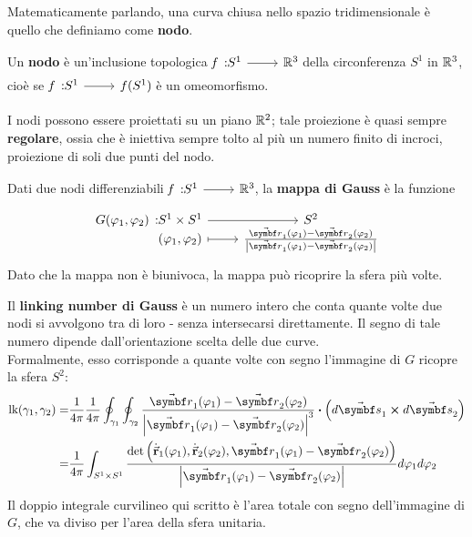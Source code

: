 Matematicamente parlando, una curva chiusa nello spazio tridimensionale è quello che definiamo come \textbf{nodo}.
\begin{define}[Nodo]
	Un \textbf{nodo} è un'inclusione topologica $\funz[f]{S^1}{\realset^3}$ della circonferenza $S^1$ in $\mathbb{R}^3$, cioè se $\funz[f]{S^1}{f(S^1)}$ è un omeomorfismo.
\end{define}
I nodi possono essere proiettati su un piano $\mathbb{R}^2$; tale proiezione è quasi sempre \textbf{regolare}, ossia che è iniettiva sempre tolto al più un numero finito di incroci, proiezione di soli due punti del nodo.
\begin{define}
	Dati due nodi differenziabili $\funz[f]{S^1}{\realset^3}$, la \textbf{mappa di Gauss} è la funzione
	\begin{equation}
		\funztot[G(\phi_1,\phi_2)]{S^1\times S^1}{S^2}{\left(\phi_1,\phi_2\right)}{\frac{\vba{r}_1(\phi_1) - \vba{r}_2 (\phi_2)}{\abs{\vba{r}_1(\phi_1) - \vba{r}_2(\phi_2)}}}
	\end{equation}
	Dato che la mappa non è biunivoca, la mappa può ricoprire la sfera più volte.
\end{define}
\begin{define}
	Il \textbf{linking number di Gauss} è un numero intero che conta quante volte due nodi si avvolgono tra di loro - senza intersecarsi direttamente. Il segno di tale numero dipende dall'orientazione scelta delle due curve.\\
	Formalmente, esso corrisponde a quante volte con segno l'immagine di $G$ ricopre la sfera $S^2$:
	\begin{align}
		\textrm{lk}(\gamma_1,\gamma_2)=&\frac{1}{4\pi}\frac{1}{4\pi}\oint_{\gamma_1} \oint_{\gamma_2} \frac{\vba{r}_1(\phi_1) - \vba{r}_2 (\phi_2)}{\abs{\vba{r}_1(\phi_1) - \vba{r}_2(\phi_2)}^3} \vdot \left(d\vba{s}_1\cross d\vba{s}_2\right)\\
		=&\frac{1}{4\pi}\int_{S^1\times S^1}\frac{\det\left(\vbd{r}_1(\phi_1),\vbd{r}_2(\phi_2),\vba{r}_1(\phi_1)-\vba{r}_2(\phi_2)\right)}{\abs{\vba{r}_1(\phi_1) - \vba{r}_2(\phi_2)}}d\phi_1d\phi_2
	\end{align}
	Il doppio integrale curvilineo qui scritto è l'area totale con segno dell'immagine di $G$, che va diviso per l'area della sfera unitaria.
\end{define}
